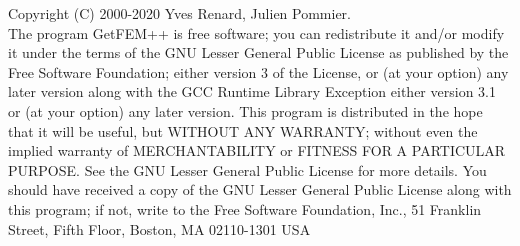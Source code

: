 Copyright (C) 2000-2020 Yves Renard, Julien Pommier.\\
The program GetFEM++ is free software; you can redistribute it and/or modify
it under the terms of the GNU Lesser General Public License as published by
the Free Software Foundation; either version 3 of the License, or
(at your option) any later version along with the GCC Runtime Library
Exception either version 3.1 or (at your option) any later version.
This program is distributed in the hope that it will be useful,
but WITHOUT ANY WARRANTY; without even the implied warranty of
MERCHANTABILITY or FITNESS FOR A PARTICULAR PURPOSE.  See the
GNU Lesser General Public License for more details.
You should have received a copy of the GNU  Lesser General Public License
along with this program; if not, write to the Free Software Foundation,
Inc., 51 Franklin Street, Fifth Floor, Boston, MA  02110-1301  USA